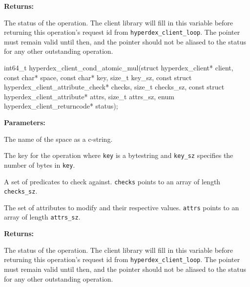 \noindent\textbf{Returns:}
\begin{description}[labelindent=\widthof{{\texttt{status}}},leftmargin=*,noitemsep,nolistsep,align=right]
\item[\texttt{status}] The status of the operation.  The client library will fill in this variable before returning this operation's request id from \texttt{hyperdex\_client\_loop}.  The pointer must remain valid until then, and the pointer should not be aliased to the status for any other outstanding operation.
\end{description}

\funcsep
\begin{ccode}
int64_t hyperdex_client_cond_atomic_mul(struct hyperdex_client* client,
                const char* space,
                const char* key, size_t key_sz,
                const struct hyperdex_client_attribute_check* checks, size_t checks_sz,
                const struct hyperdex_client_attribute* attrs, size_t attrs_sz,
                enum hyperdex_client_returncode* status);
\end{ccode}
\funcdesc 

\noindent\textbf{Parameters:}
\begin{description}[labelindent=\widthof{{\texttt{checks}, \texttt{checks\_sz}}},leftmargin=*,noitemsep,nolistsep,align=right]
\item[\texttt{space}] The name of the space as a c-string.
\item[\texttt{key}, \texttt{key\_sz}] The key for the operation where \texttt{key} is a bytestring and \texttt{key\_sz} specifies the number of bytes in \texttt{key}.
\item[\texttt{checks}, \texttt{checks\_sz}] A set of predicates to check against.  \texttt{checks} points to an array of length \texttt{checks\_sz}.
\item[\texttt{attrs}, \texttt{attrs\_sz}] The set of attributes to modify and their respective values.  \texttt{attrs} points to an array of length \texttt{attrs\_sz}.
\end{description}

\noindent\textbf{Returns:}
\begin{description}[labelindent=\widthof{{\texttt{status}}},leftmargin=*,noitemsep,nolistsep,align=right]
\item[\texttt{status}] The status of the operation.  The client library will fill in this variable before returning this operation's request id from \texttt{hyperdex\_client\_loop}.  The pointer must remain valid until then, and the pointer should not be aliased to the status for any other outstanding operation.
\end{description}

